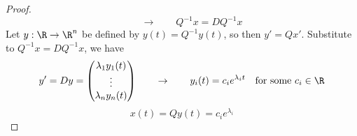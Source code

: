 \documentclass[11pt]{article}
\begin{document}
\begin{enumerate}
\begin{proof}
\[            \quad \quad \rightarrow 
            \quad \quad 
            Q^{-1}x = DQ^{-1}x
        \]
        Let $y:\R\to \R^n$ be defined by $y(t) = Q^{-1}y(t)$, so then $y' = Qx'$. Substitute to $Q^{-1}x = DQ^{-1}x$, we have 
        \[
            y' = Dy = 
            \begin{pmatrix}
                \lambda_1 y_1(t) \\
                \vdots \\
                \lambda_n y_n(t) \\
            \end{pmatrix}
            \quad \quad \rightarrow \quad \quad 
            y_i(t) = c_i e^{\lambda_i t}
            \quad \text{for some } c_i\in \R 
        \]
        \[
            x(t) = Qy(t) = c_i e^{\lambda_i }    
        \]
    \end{proof}
\end{enumerate}
\end{document}
